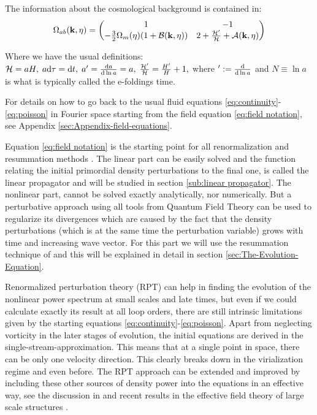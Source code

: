 The information about the cosmological background is contained in:
\begin{equation}
\Omega_{ab}(\mathbf{k},\eta)=\begin{pmatrix}1 & -1\\
-\frac{3}{2}\Omega_{m}(\eta)(1+\mathcal{B}(\mathbf{k},\eta)) & 2+\frac{\mathcal{H}'}{\mathcal{H}}+\mathcal{A}(\mathbf{k},\eta)
\end{pmatrix}\label{eq:general-Omega-Matrix}
\end{equation}


Where we have the usual definitions: $\mathcal{H}=aH,\; a\mbox{d}\tau=\mbox{d}t,\; a'=\frac{\mathrm{d}a}{\mathrm{d}\ln a}=a,\;\frac{\mathcal{H}'}{\mathcal{H}}=\frac{H'}{H}+1,$
where $':=\frac{\mathrm{d}}{\mathrm{d}\ln a}$ and $N\equiv\ln a$ is what is typically
called the e-foldings time.

For details on how to go back to the usual fluid equations \ref{eq:continuity}-\ref{eq:poisson}
in Fourier space starting from the field equation \ref{eq:field notation},
see Appendix \ref{sec:Appendix-field-equations}.

Equation \ref{eq:field notation} is the starting point for all renormalization
and resummation methods \cite{crocce_renormalized_2005,bernardeau_evolution_2013,bernardeau_constructing_2012,valageas_matter_2013,anselmi_nonlinear_2012,anselmi_next--leading_2010}.
The linear part can be easily solved and the function relating the
initial primordial density perturbations to the final one, is called
the linear propagator and will be studied in section \ref{sub:linear propagator}.
The nonlinear part, cannot be solved exactly analytically, nor numerically.
But a perturbative approach using all tools from Quantum Field Theory
can be used to regularize its divergences which are caused by the
fact that the density perturbations (which is at the same time the
perturbation variable) grows with time and increasing wave vector.
For this part we will use the resummation technique of \cite{anselmi_nonlinear_2012}
and this will be explained in detail in section \ref{sec:The-Evolution-Equation}.

Renormalized perturbation theory (RPT) can help in finding the evolution
of the nonlinear power spectrum at small scales and late times, but
even if we could calculate exactly its result at all loop orders,
there are still intrinsic limitations given by the starting equations
\ref{eq:continuity}-\ref{eq:poisson}. Apart from neglecting vorticity
in the later stages of evolution, the initial equations are derived
in the single-stream-approximation. This means that at a single point
in space, there can be only one velocity direction. This clearly breaks
down in the virialization regime and even before. The RPT approach
can be extended and improved by including these other sources of density
power into the equations in an effective way, see the discussion in
\cite{manzotti_coarse_2014,pietroni_coarse-grained_2011} and recent
results in the effective field theory of large scale structures \cite{baumann_cosmological_2012,pajer_renormalization_2013,senatore_ir-resummed_2014,carrasco_effective_2012}.


